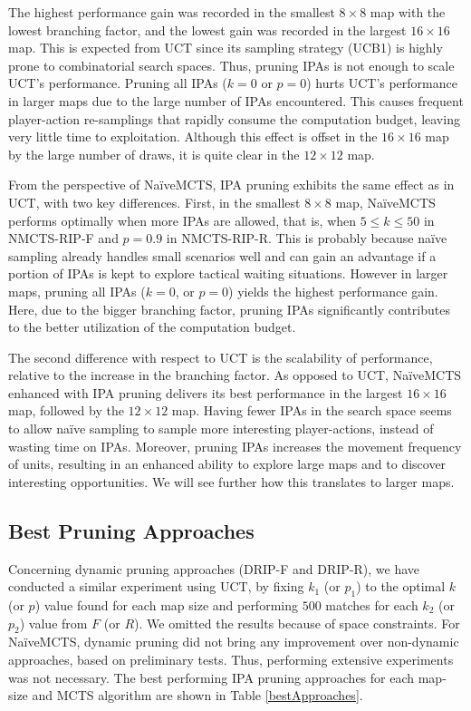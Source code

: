 \documentclass[conference]{IEEEtran}
\begin{document}
The highest performance gain was recorded in the smallest $8\times8$ map with the lowest branching factor, and the lowest gain was recorded in the largest $16\times16$ map. This is expected from UCT since its sampling strategy (UCB1) is highly prone to combinatorial search spaces. Thus, pruning IPAs is not enough to scale UCT's performance. Pruning all IPAs ($k = 0$ or $p = 0$) hurts UCT's performance in larger maps due to the large number of IPAs encountered. This causes frequent player-action re-samplings that rapidly consume the computation budget, leaving very little time to exploitation. Although this effect is offset in the $16\times16$ map by the large number of draws, it is quite clear in the $12\times12$ map.

From the perspective of NaïveMCTS, IPA pruning exhibits the same effect as in UCT, with two key differences. First, in the smallest $8\times8$ map, NaïveMCTS performs optimally when more IPAs are allowed, that is, when $5 \leq k \leq 50$ in NMCTS-RIP-F and $p=0.9$ in NMCTS-RIP-R. This is probably because naïve sampling already handles small scenarios well and can gain an advantage if a portion of IPAs is kept to explore tactical waiting situations. However in larger maps, pruning all IPAs ($k = 0$, or $p = 0$) yields the highest performance gain. Here, due to the bigger branching factor, pruning IPAs significantly contributes to the better utilization of the computation budget.

The second difference with respect to UCT is the scalability of performance, relative to the increase in the branching factor. As opposed to UCT, NaïveMCTS enhanced with IPA pruning delivers its best performance in the largest $16\times16$ map, followed by the $12\times12$ map. Having fewer IPAs in the search space seems to allow naïve sampling to sample more interesting player-actions, instead of wasting time on IPAs. Moreover, pruning IPAs increases the movement frequency of units, resulting in an enhanced ability to explore large maps and to discover interesting opportunities. We will see further how this translates to larger maps.


\subsection{Best Pruning Approaches}

Concerning dynamic pruning approaches (DRIP-F and DRIP-R), we have conducted a similar experiment using UCT, by fixing $k_1$ (or $p_1$) to the optimal $k$ (or $p$) value found for each map size and performing $500$ matches for each $k_2$ (or $p_2$) value from $F$ (or $R$). We omitted the results because of space constraints. For NaïveMCTS, dynamic pruning did not bring any improvement over non-dynamic approaches, based on preliminary tests. Thus, performing extensive experiments was not necessary. The best performing IPA pruning approaches for each map-size and MCTS algorithm are shown in Table \ref{bestApproaches}.
\end{document}
